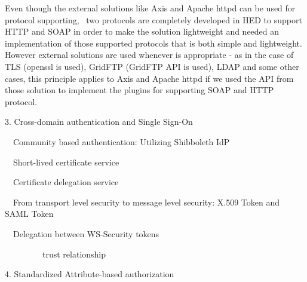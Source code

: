\documentclass{article}
\begin{document}
Even though the external solutions like Axis and Apache httpd can be
used for protocol supporting, \ two protocols are completely developed
in HED to support HTTP and SOAP in order to make the solution
lightweight and needed an implementation of those supported protocols
that is both simple and lightweight. However external solutions are
used whenever is appropriate - as in the case of TLS (openssl is used),
GridFTP (GridFTP API is used), LDAP and some other cases, this
principle applies to Axis and Apache httpd if we used the API from
those solution to implement the plugins for supporting SOAP and HTTP
protocol. 


\bigskip


\bigskip


\bigskip

3. Cross-domain authentication and Single Sign-On


\bigskip

\ \ Community based authentication: Utilizing Shibboleth IdP


\bigskip

\ \ Short-lived certificate service


\bigskip

\ \ Certificate delegation service


\bigskip

\ \ From transport level security to message level security: X.509 Token
and SAML Token


\bigskip

\ \ Delegation between WS-Security tokens


\bigskip

\ \ \ \ \ \ \ \ \ trust relationship


\bigskip

4. Standardized Attribute-based authorization 


\bigskip


\bigskip


\bigskip


\bigskip


\bigskip


\bigskip
\end{document}
